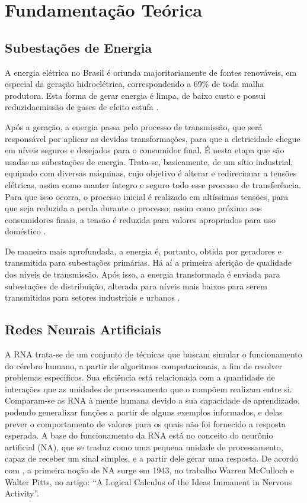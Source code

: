 \chapter{Fundamentação Teórica}

\section{Subestações de Energia}
\label{sec:subestacao}

A energia elétrica no Brasil é oriunda majoritariamente de fontes renováveis, em especial da geração hidroelétrica, correspondendo a 69\% de toda malha produtora. Esta forma de gerar energia é limpa, de baixo custo e possui reduzidaemissão de gases de efeito estufa \cite{de2015hydroelectric}. 

Após a geração, a energia passa pelo processo de transmissão, que será responsável por aplicar as devidas transformações, para que a eletricidade chegue em níveis seguros e desejados para o consumidor final. É nesta etapa que são usadas as subestações de energia. Trata-se, basicamente, de um sítio industrial, equipado com diversas máquinas, cujo objetivo é alterar e redirecionar a tensões elétricas, assim como manter íntegro e seguro todo esse processo de transferência. Para que isso ocorra, o processo inicial é realizado em altíssimas tensões, para que seja reduzida a perda durante o processo; assim como próximo aos consumidores finais, a tensão é reduzida para valores apropriados para uso doméstico \cite {muzysubestaccoes}.

De maneira mais aprofundada, a energia é, portanto, obtida por geradores e transmitida para subestações primárias. Há aí a primeira aferição de qualidade dos níveis de transmissão. Após isso, a energia transformada é enviada para subestações de distribuição, alterada para níveis mais baixos para serem transmitidas para setores industriais e urbanos \cite{barreto2022proposta}.

\section{Redes Neurais Artificiais}
\label{sec:redesneurais}

A RNA trata-se de um conjunto de técnicas que buscam simular o funcionamento do cérebro humano, a partir de algoritmos computacionais, a fim de resolver problemas específicos. Sua eficiência está relacionada com a quantidade de interações que as unidades de processamento que o compõem realizam entre si. Comparam-se as RNA à mente humana devido a sua capacidade de aprendizado, podendo generalizar funções a partir de alguns exemplos informados, e delas prever o comportamento de valores para os quais não foi fornecido a resposta esperada. A base do funcionamento da RNA está no conceito do neurônio artificial (NA), que se traduz como uma pequena unidade de processamento, capaz de receber um sinal simples, e a partir dele gerar uma resposta.  De acordo com  \cite{fleck2016redes}, a primeira noção de NA surge em 1943, no trabalho Warren McCulloch e Walter Pitts, no artigo: “A Logical Calculus of the Ideas Immanent in Nervous Activity”.

